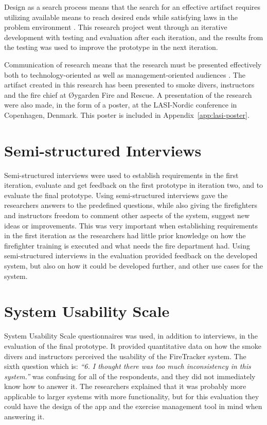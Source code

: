 \documentclass[../Main/thesis.tex]{subfiles}
\begin{document}
Design as a search process means that the search for an effective artifact requires utilizing available means to reach desired ends while satisfying laws in the problem environment \citep{hevner2004design}. 
This research project went through an iterative development with testing and evaluation after each iteration, and the results from the testing was used to improve the prototype in the next iteration.

Communication of research means that the research must be presented effectively both to technology-oriented as well as management-oriented audiences \citep{hevner2004design}. 
The artifact created in this research has been presented to smoke divers, instructors and the fire chief at Øygarden Fire and Rescue.
A presentation of the research were also made, in the form of a poster, at the LASI-Nordic conference in Copenhagen, Denmark.
This poster is included in Appendix~\ref{app:lasi-poster}.

\section{Semi-structured Interviews}
Semi-structured interviews were used to establish requirements in the first iteration, evaluate and get feedback on the first prototype in iteration two, and to evaluate the final prototype.
Using semi-structured interviews gave the researchers answers to the predefined questions, while also giving the firefighters and instructors freedom to comment other aspects of the system, suggest new ideas or improvements.
This was very important when establishing requirements in the first iteration as the researchers had little prior knowledge on how the firefighter training is executed and what needs the fire department had.
Using semi-structured interviews in the evaluation provided feedback on the developed system, but also on how it could be developed further, and other use cases for the system.

\section{System Usability Scale}
System Usability Scale questionnaires was used, in addition to interviews, in the evaluation of the final prototype.
It provided quantitative data on how the smoke divers and instructors perceived the usability of the FireTracker system.
The sixth question which is: \textit{``6. I thought there was too much inconsistency in this system.''} was confusing for all of the respondents, and they did not immediately know how to answer it.
The researchers explained that it was probably more applicable to larger systems with more functionality, but for this evaluation they could have the design of the app and the exercise management tool in mind when answering it.
\end{document}

